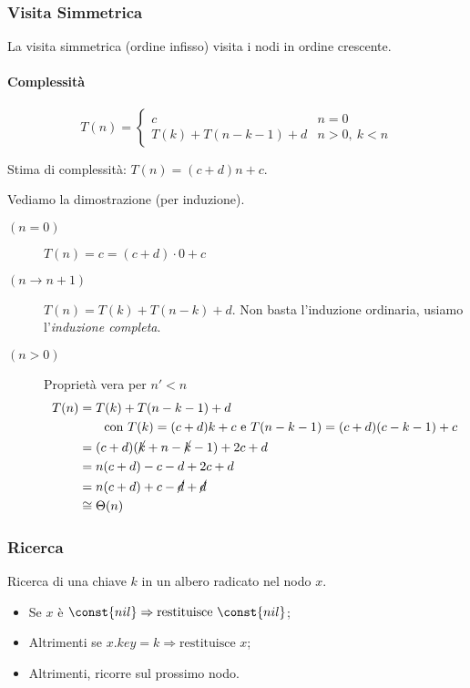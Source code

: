 \subsubsection{Visita Simmetrica} La visita simmetrica (ordine infisso) visita i nodi in ordine
crescente.



\paragraph{Complessità} 
\[ T(n) =
\begin{cases}
	c & n = 0 \\
	T(k) + T(n - k - 1) + d & n > 0, \ k < n
\end{cases}
\]

Stima di complessità: $T(n) = (c+d)n + c$. \par
Vediamo la dimostrazione (per induzione).

\begin{description}
	\item[$(n = 0)$] $T(n) = c = (c + d) \cdot 0 + c$
	\item[$(n \rightarrow n+1)$] $T(n) = T(k) + T(n-k) + d$. Non basta l'induzione ordinaria, usiamo 
	l'\emph{induzione completa}.
	\item[$(n > 0)$] Proprietà vera per $n' < n$
	\begin{align*}
		T(n) & = T(k) + T(n - k - 1) + d \\
		& \qquad \text{con } T(k) = (c+d)k + c \text{ e } T(n-k-1) = (c+d)(c-k-1)+c \\
		& = (c+d)(\cancel{k} + n - \cancel{k} - 1) + 2c + d \\
		& = n(c+d) - c - d + 2c + d \\
		& = n(c+d) + c - \cancel{d} + \cancel{d} \\
		& \cong \Theta(n)
	\end{align*}
\end{description}

\subsubsection{Ricerca} 
Ricerca di una chiave $k$ in un albero radicato nel nodo $x$.

\begin{itemize}
	\item Se $x$ è $\const{nil} \Rightarrow \text{restituisce } \const{nil}$;
	\item Altrimenti se $x.key = k \Rightarrow \text{restituisce } x$;
	\item Altrimenti, ricorre sul prossimo nodo.
\end{itemize}

